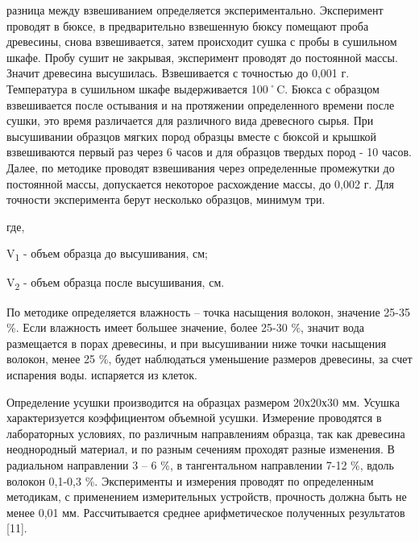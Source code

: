 разница между взвешиванием определяется экспериментально. Эксперимент
проводят в бюксе, в предварительно взвешенную бюксу помещают проба
древесины, снова взвешивается, затем происходит сушка с пробы в
сушильном шкафе. Пробу сушит не закрывая, эксперимент проводят до
постоянной массы. Значит древесина высушилась. Взвешивается с точностью
до 0,001 г. Температура в сушильном шкафе выдерживается 100˚C. Бюкса с
образцом взвешивается после остывания и на протяжении определенного
времени после сушки, это время различается для различного вида
древесного сырья. При высушивании образцов мягких пород образцы вместе с
бюксой и крышкой взвешиваются первый раз через 6 часов и для образцов
твердых пород - 10 часов. Далее, по методике проводят взвешивания через
определенные промежутки до постоянной массы, допускается некоторое
расхождение массы, до 0,002 г. Для точности эксперимента берут несколько
образцов, минимум три.


где,

V\textsubscript{1} - объем образца до высушивания, см;

V\textsubscript{2} - объем образца после высушивания, см.

По методике определяется влажность -- точка насыщения волокон, значение
25-35 \%. Если влажность имеет большее значение, более 25-30 \%, значит
вода размещается в порах древесины, и при высушивании ниже точки
насыщения волокон, менее 25 \%, будет наблюдаться уменьшение размеров
древесины, за счет испарения воды. испаряется из клеток.

Определение усушки производится на образцах размером 20х20х30 мм. Усушка
характеризуется коэффициентом объемной усушки. Измерение проводятся в
лабораторных условиях, по различным направлениям образца, так как
древесина неоднородный материал, и по разным сечениям проходят разные
изменения. В радиальном направлении 3 -- 6 \%, в тангентальном
направлении 7-12 \%, вдоль волокон 0,1-0,3 \%. Эксперименты и измерения
проводят по определенным методикам, с применением измерительных
устройств, прочность должна быть не менее 0,01 мм. Рассчитывается
среднее арифметическое полученных результатов {[}11{]}.

